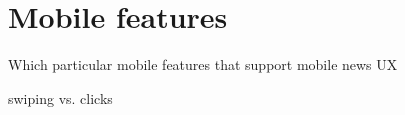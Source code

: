\chapter{Mobile features}
Which particular mobile features that support mobile news UX

swiping vs. clicks